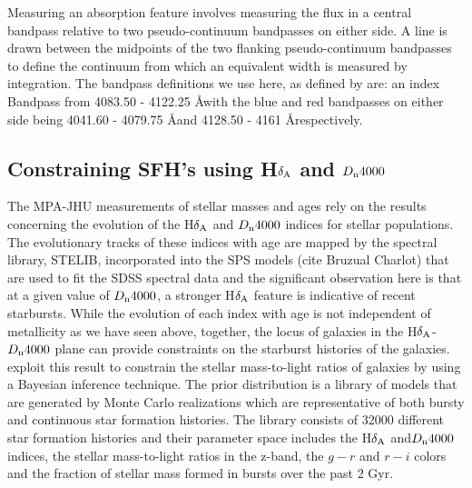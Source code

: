Measuring an absorption feature involves measuring the flux in a central bandpass relative to two pseudo-continuum bandpasses on either side. A line is drawn between the midpoints of the two flanking pseudo-continuum bandpasses to define the continuum from which an equivalent width is measured by integration. The bandpass definitions we use here, as defined by \citet{worthey_comprehensive_1994} are: an index Bandpass from 4083.50 - 4122.25 \AA with the blue and red bandpasses on either side being 4041.60 - 4079.75 \AA and 4128.50 - 4161 \AA respectively.

\subsection{Constraining SFH's using H$\delta_{\rm A}$ and $D_{\rm n}4000$}
\label{kauffmann method}

The MPA-JHU measurements of stellar masses and ages rely on the results concerning the evolution of the H$\delta_{\rm A}$ and $D_{\rm n}4000$ indices for stellar populations. The evolutionary tracks of these indices with age are mapped by the spectral library, STELIB, incorporated into the SPS models (cite Bruzual Charlot) that are used to fit the SDSS spectral data and the significant observation here is that at a given value of $D_{\rm n}4000$, a stronger H$\delta_{\rm A}$ feature is indicative of recent starbursts. While the evolution of each index with age is not independent of metallicity as we have seen above, together, the locus of galaxies in the H$\delta_{\rm A}$-$D_{\rm n}4000$ plane can provide constraints on the starburst histories of the galaxies. \citet{kauffmann2013} exploit this result to constrain the stellar mass-to-light ratios of galaxies by using a Bayesian inference technique. The prior distribution is a library of models that are generated by Monte Carlo realizations which are representative of both bursty and continuous star formation histories. The library consists of 32000 different star formation histories and their parameter space includes the H$\delta_{\rm A}$ and$D_{\rm n}4000$ indices, the stellar mass-to-light ratios in the z-band, the $g-r$ and $r-i$ colors and the fraction of stellar mass formed in bursts over the past 2 Gyr.\\

